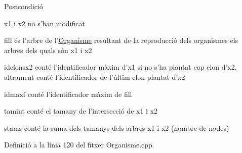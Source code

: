 \begin{DoxyPostcond}{Postcondició}

\begin{DoxyItemize}
\item {\ttfamily x1} i {\ttfamily x2} no s'han modificat 
\item {\ttfamily fill} és l'arbre de l'\hyperlink{class_organisme}{Organisme} resultant de la reproducció dels organismes els arbres dels quals són {\ttfamily x1} i {\ttfamily x2} 
\item {\ttfamily idclonsx2} conté l'identificador màxim d'{\ttfamily x1} si no s'ha plantat cap clon d'{\ttfamily x2}, altrament conté l'identificador de l'últim clon plantat d'{\ttfamily x2} 
\item {\ttfamily idmaxf} conté l'identificador màxim de {\ttfamily fill} 
\item {\ttfamily tamint} conté el tamany de l'intersecció de {\ttfamily x1} i {\ttfamily x2} 
\item {\ttfamily stams} conté la suma dels tamanys dels arbres {\ttfamily x1} i {\ttfamily x2} (nombre de nodes) 
\end{DoxyItemize}
\end{DoxyPostcond}


Definició a la línia 120 del fitxer Organisme.\-cpp.


